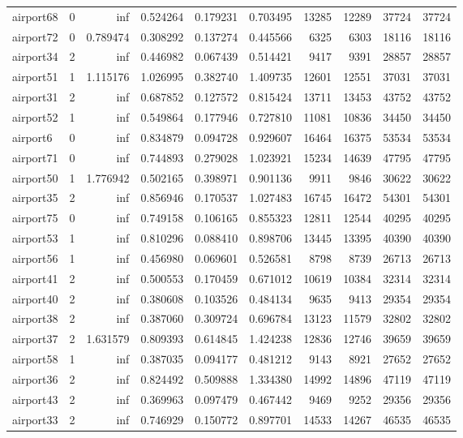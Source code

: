 \begin{longtable}{|l|r|r|r|r|r|r|r|r|r|}
airport68 & 0 & inf & 0.524264 & 0.179231 & 0.703495 & 13285 & 12289 & 37724 & 37724 \\
airport72 & 0 & 0.789474 & 0.308292 & 0.137274 & 0.445566 & 6325 & 6303 & 18116 & 18116 \\
airport34 & 2 & inf & 0.446982 & 0.067439 & 0.514421 & 9417 & 9391 & 28857 & 28857 \\
airport51 & 1 & 1.115176 & 1.026995 & 0.382740 & 1.409735 & 12601 & 12551 & 37031 & 37031 \\
airport31 & 2 & inf & 0.687852 & 0.127572 & 0.815424 & 13711 & 13453 & 43752 & 43752 \\
airport52 & 1 & inf & 0.549864 & 0.177946 & 0.727810 & 11081 & 10836 & 34450 & 34450 \\
airport6 & 0 & inf & 0.834879 & 0.094728 & 0.929607 & 16464 & 16375 & 53534 & 53534 \\
airport71 & 0 & inf & 0.744893 & 0.279028 & 1.023921 & 15234 & 14639 & 47795 & 47795 \\
airport50 & 1 & 1.776942 & 0.502165 & 0.398971 & 0.901136 & 9911 & 9846 & 30622 & 30622 \\
airport35 & 2 & inf & 0.856946 & 0.170537 & 1.027483 & 16745 & 16472 & 54301 & 54301 \\
airport75 & 0 & inf & 0.749158 & 0.106165 & 0.855323 & 12811 & 12544 & 40295 & 40295 \\
airport53 & 1 & inf & 0.810296 & 0.088410 & 0.898706 & 13445 & 13395 & 40390 & 40390 \\
airport56 & 1 & inf & 0.456980 & 0.069601 & 0.526581 & 8798 & 8739 & 26713 & 26713 \\
airport41 & 2 & inf & 0.500553 & 0.170459 & 0.671012 & 10619 & 10384 & 32314 & 32314 \\
airport40 & 2 & inf & 0.380608 & 0.103526 & 0.484134 & 9635 & 9413 & 29354 & 29354 \\
airport38 & 2 & inf & 0.387060 & 0.309724 & 0.696784 & 13123 & 11579 & 32802 & 32802 \\
airport37 & 2 & 1.631579 & 0.809393 & 0.614845 & 1.424238 & 12836 & 12746 & 39659 & 39659 \\
airport58 & 1 & inf & 0.387035 & 0.094177 & 0.481212 & 9143 & 8921 & 27652 & 27652 \\
airport36 & 2 & inf & 0.824492 & 0.509888 & 1.334380 & 14992 & 14896 & 47119 & 47119 \\
airport43 & 2 & inf & 0.369963 & 0.097479 & 0.467442 & 9469 & 9252 & 29356 & 29356 \\
airport33 & 2 & inf & 0.746929 & 0.150772 & 0.897701 & 14533 & 14267 & 46535 & 46535 \\

\end{longtable}
